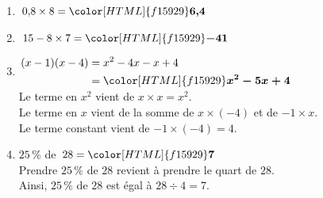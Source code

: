 \documentclass[a4paper,11pt,landscape,exos]{nsi} %
\begin{document}
\begin{multicols}{2}
    \maketitle
\begin{enumerate}[itemsep=.75em]
    \item $0{,}8 \times 8={\color[HTML]{f15929}\boldsymbol{6{,}4}}$
\item $15-8\times7={\color[HTML]{f15929}\boldsymbol{-41}}$
\item $\begin{aligned}
      (x-1)(x-4)&=x^2-4x-x+4\\
      &={\color[HTML]{f15929}\boldsymbol{x^2-5x+4}}
      \end{aligned}$\\Le terme en $x^2$ vient de $x\times x=x^2$.\\Le terme en $x$ vient de la somme de $x \times (-4)$ et de $-1 \times x$.\\Le terme constant vient de $-1\times (-4)= 4$.
\item $25\,\%$ de $28 = {\color[HTML]{f15929}\boldsymbol{7}}$\\ Prendre $25\,\%$  de $28$ revient à prendre le quart de $28$.\\
      Ainsi, $25\,\%$ de $28$ est égal à $28\div 4 =7$.
     

\end{enumerate}
\end{multicols}
\end{document}
